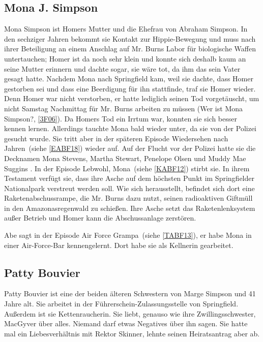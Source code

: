 \subsection{Mona J. Simpson}\label{MonaSimpson}
Mona Simpson ist Homers Mutter und die Ehefrau von Abraham Simpson. In den sechziger Jahren bekommt sie Kontakt zur Hippie-Bewegung und muss nach ihrer Beteiligung an einem Anschlag auf Mr. Burns Labor für biologische Waffen untertauchen; Homer ist da noch sehr klein und konnte sich deshalb kaum an seine Mutter erinnern und dachte sogar, sie wäre tot, da ihm das sein Vater gesagt hatte. Nachdem Mona nach Springfield kam, weil sie dachte, dass Homer gestorben sei und dass eine Beerdigung für ihn stattfinde, traf sie Homer wieder. Denn Homer war nicht verstorben, er hatte lediglich seinen Tod vorgetäuscht, um nicht Samstag Nachmittag für Mr. Burns arbeiten zu müssen (\glqq Wer ist Mona Simpson?\grqq , \ref{3F06}). Da Homers Tod ein Irrtum war, konnten sie sich besser kennen lernen. Allerdings tauchte Mona bald wieder unter, da sie von der Polizei gesucht wurde. Sie tritt aber in der späteren Episode \glqq Wiedersehen nach Jahren\grqq\ (siehe \ref{EABF18}) wieder auf. Auf der Flucht vor der Polizei hatte sie die Decknamen Mona Stevens, Martha Stewart, Penelope Olsen und Muddy Mae Suggins \cite{Wikipedia}. In der Episode \glqq Lebwohl, Mona\grqq\ (siehe \ref{KABF12}) stirbt sie. In ihrem Testament verfügt sie, dass ihre Asche auf dem höchsten Punkt im Springfielder Nationalpark verstreut werden soll. Wie sich herausstellt, befindet sich dort eine Raketenabschussrampe, die Mr. Burns dazu nutzt, seinen radioaktiven Giftmüll in den Amazonasregenwald zu schießen. Ihre Asche setzt das Raketenlenksystem außer Betrieb und Homer kann die Abschussanlage zerstören.

Abe sagt in der Episode \glqq Air Force Grampa\grqq\ (siehe \ref{TABF13}), er habe Mona in einer Air-Force-Bar kennengelernt. Dort habe sie als Kellnerin gearbeitet.

\subsection{Patty Bouvier}
Patty Bouvier ist eine der beiden älteren Schwestern von Marge Simpson und 41 Jahre alt. Sie arbeitet in der Führerschein-Zulassungsstelle von Springfield. Außerdem ist sie Kettenraucherin. Sie liebt, genauso wie ihre Zwillingsschwester, MacGyver über alles. Niemand darf etwas Negatives über ihn sagen. Sie hatte mal ein Liebes\-ver\-hält\-nis mit Rektor Skinner, lehnte seinen Heiratsantrag aber ab.

